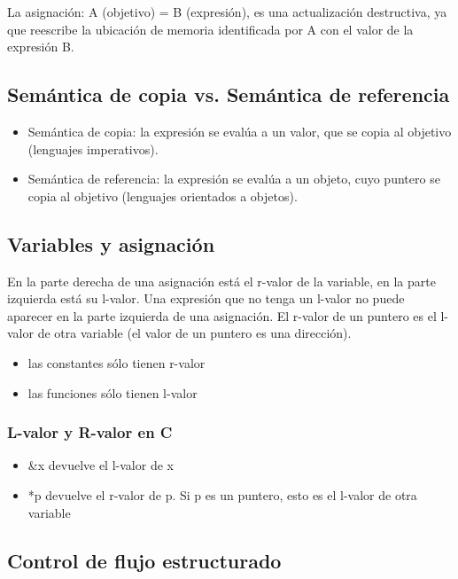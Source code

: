 \documentclass[10pt,a4paper]{report}
\begin{document}
		\par La asignación: A (objetivo) = B (expresión), es una actualización 
		destructiva, ya que reescribe la ubicación de memoria identificada por 
		A con el valor de la expresión B.

\subsection{Semántica de copia vs. Semántica de referencia}
		\begin{itemize}
		\item Semántica de copia: la expresión se evalúa a un valor, que se 
		copia al objetivo (lenguajes imperativos).
		\item Semántica de referencia: la expresión se evalúa a un objeto, 	
		cuyo puntero se copia al objetivo (lenguajes orientados a objetos).
		\end{itemize}

\subsection{Variables y asignación}
		\par En la parte derecha de una asignación está el r-valor de la 
		variable, en la parte izquierda está su l-valor. Una expresión que no 
		tenga un l-valor no puede aparecer en la parte izquierda de una 
		asignación. El r-valor de un puntero es el l-valor de otra variable (el 
		valor de un puntero es una dirección).
		
		\begin{itemize}
		\item las constantes sólo tienen r-valor
 		\item las funciones sólo tienen l-valor
		\end{itemize}

		\subsubsection{L-valor y R-valor en C}
		\begin{itemize}
		\item \&x devuelve el l-valor de x 
    	\item *p devuelve el r-valor de p. Si p es un puntero, esto es el l-valor 
    	de otra variable
		\end{itemize}

\subsection{Control de flujo estructurado}
\end{document}
